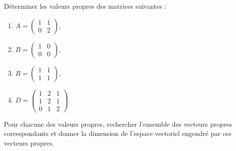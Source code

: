 

\begin{exercice}\label{exoINGE1121La0011}

	Déterminer les valeurs propres des matrices suivantes :
	\begin{enumerate}

		\item
			$A=\begin{pmatrix}
				1	&	1	\\ 
				0	&	2	
			\end{pmatrix}$,
		\item
			$B=\begin{pmatrix}
				1	&	0	\\ 
				0	&	0	
			\end{pmatrix}$,
		\item
			$R=\begin{pmatrix}
				1	&	1	\\ 
				1	&	1	
			\end{pmatrix}$,
		\item
			$D=\begin{pmatrix}
				1	&	2	&	1	\\
				1	&	2	&	1	\\
				0	&	1	&	2
			\end{pmatrix}$.

	\end{enumerate}

	Pour chacune des valeurs propres, rechercher l'ensemble des vecteurs propres correspondants et donner la dimension de l'espace vectoriel engendré par ces vecteurs propres.

\end{exercice}
